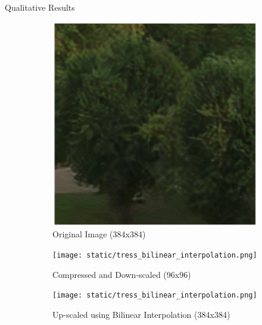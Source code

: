 \documentclass{beamer}
\begin{document}
\begin{frame}{Qualitative Results}
  \begin{figure}
    \centering
    \begin{subfigure}{0.18\textwidth}
      \includegraphics[width=\linewidth]{static/trees_srunet.png}
      \caption{Original Image (384x384)}
    \end{subfigure}
    \hfill
    \begin{subfigure}{0.18\textwidth}
      \texttt{[image: static/tress\_bilinear\_interpolation.png]}
      \caption{Compressed and Down-scaled (96x96)}
    \end{subfigure}
    \hfill
    \begin{subfigure}{0.18\textwidth}
      \texttt{[image: static/tress\_bilinear\_interpolation.png]}
      \caption{Up-scaled using Bilinear Interpolation (384x384)}
    \end{subfigure}
    \hfill
    \begin{subfigure}{0.18\textwidth}

\end{subfigure}
\end{figure}
\end{frame}
\end{document}
